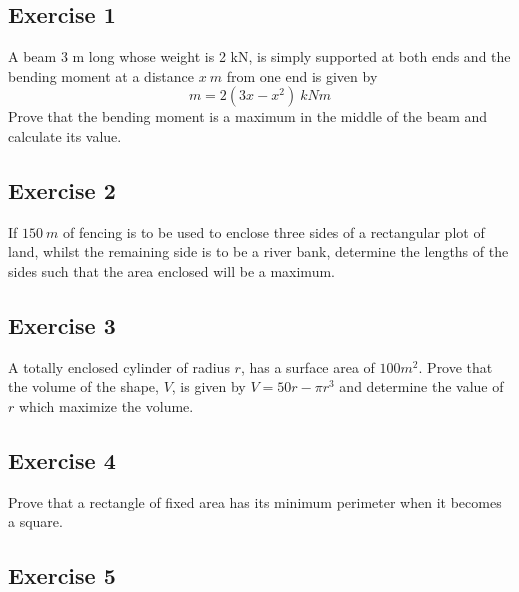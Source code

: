 \documentclass[
  11pt,
  oneside]{book}
\newcommand{\slide}{}
\theoremstyle{definition}
\theoremstyle{definition}
\theoremstyle{definition}
\theoremstyle{definition}
\theoremstyle{remark}
\begin{document}
\subsection*{Exercise 1}\label{exercise-1-4}

A beam 3 m long whose weight is 2 kN, is simply supported at both ends and the bending moment at a distance \(x\ m\) from one end is given by
\[
m = 2(3x - x^2)\ kNm
\]
Prove that the bending moment is a maximum in the middle of the beam and calculate its value.

\slide

\subsection*{Exercise 2}\label{exercise-2-4}

If \(150\ m\) of fencing is to be used to enclose three sides of a rectangular plot of land, whilst the remaining side is to be a river bank, determine the lengths of the sides such that the area enclosed will be a maximum.

\slide

\subsection*{Exercise 3}\label{exercise-3-3}

A totally enclosed cylinder of radius \(r\), has a surface area of \(100 m^2\). Prove that the volume of the shape, \(V\), is given by \(V = 50r - \pi r^3\) and determine the value of \(r\) which maximize the volume.

\slide

\subsection*{Exercise 4}\label{exercise-4-3}

Prove that a rectangle of fixed area has its minimum perimeter when it becomes a square.

\slide

\subsection*{Exercise 5}\label{exercise-5-2}
\end{document}
